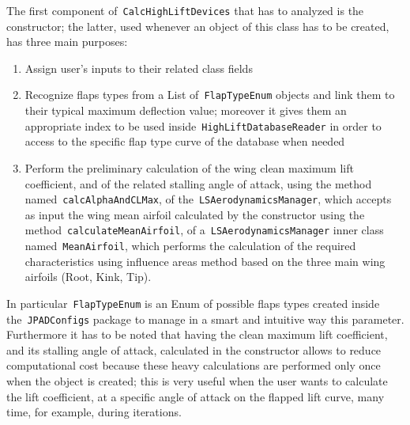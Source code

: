 \bigskip
\noindent
The first component of~\lstinline[language=Java]!CalcHighLiftDevices! that has to analyzed is the constructor; the latter, used whenever an object of this class has to be created, has three main purposes:
%
\begin{enumerate}
\item Assign user's inputs to their related class fields
\item Recognize flaps types from a \gls{List} of~\lstinline[language=Java]!FlapTypeEnum! objects and link them to their typical maximum deflection value; moreover it gives them an appropriate index to be used inside~\lstinline[language=Java]!HighLiftDatabaseReader! in order to access to the specific flap type curve of the database when needed
\item Perform the preliminary calculation of the wing clean maximum lift coefficient, and of the related stalling angle of attack, using the method named~\lstinline[language=Java]!calcAlphaAndCLMax!, of the~\lstinline[language=Java]!LSAerodynamicsManager!, which accepts as input the wing mean airfoil calculated by the constructor using the method~\lstinline[language=Java]!calculateMeanAirfoil!, of a~\lstinline[language=Java]!LSAerodynamicsManager! inner class named~\lstinline[language=Java]!MeanAirfoil!, which performs the calculation of the required characteristics using influence areas method based on the three main wing airfoils (Root, Kink, Tip).   
\end{enumerate}
%
\noindent
In particular~\lstinline[language=Java]!FlapTypeEnum! is an \gls{Enum}\cite{enumAPI} of possible flaps types created inside the~\lstinline[language=Java]!JPADConfigs! package to manage in a smart and intuitive way this parameter. 
%
Furthermore it has to be noted that having the clean maximum lift coefficient, and its stalling angle of attack, calculated in the constructor allows to reduce computational cost because these heavy calculations are performed only once when the object is created; this is very useful when the user wants to calculate the lift coefficient, at a specific angle of attack on the flapped lift curve, many time, for example, during iterations.  
%
\begin{table}[!t]
\caption{Summary of available flaps types with their related properties}
\label{table:AvailableFlaps}
\end{table}
